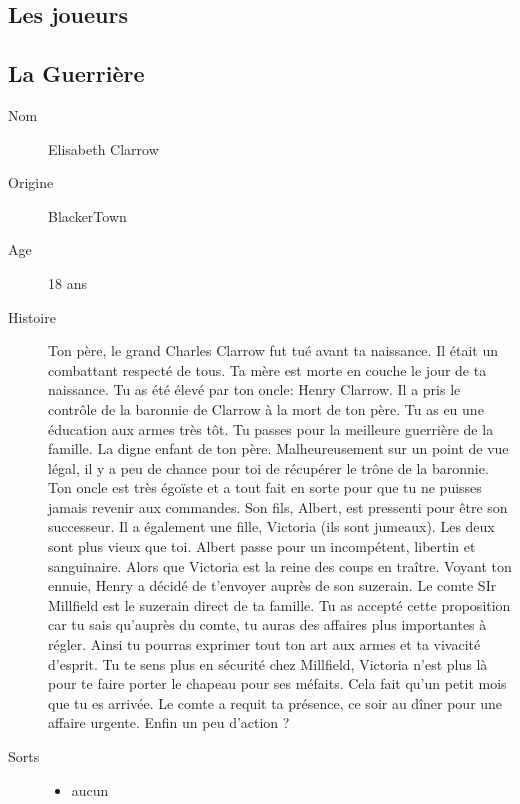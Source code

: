 \documentclass[oneside,12pt]{book}
\begin{document}
\begin{flushleft}
\clearpage

\section{Les joueurs}
\subsection{La Guerrière}
\begin{description}
\item[Nom]{ Elisabeth Clarrow}
\item[Origine]{BlackerTown}
\item[Age]{ 18 ans}
\item[Histoire]{Ton père, le grand Charles Clarrow fut tué avant ta naissance. Il était un combattant respecté de tous. Ta mère est morte en couche le jour de ta naissance. Tu as été élevé par ton oncle: Henry Clarrow. Il a pris le contrôle de la baronnie de Clarrow à la mort de ton père. Tu as eu une éducation aux armes très tôt. Tu passes pour la meilleure guerrière de la famille. La digne enfant de ton père. Malheureusement sur un point de vue légal, il y a peu de chance pour toi de récupérer le trône de la baronnie. Ton oncle est très égoïste et a tout fait en sorte pour que tu ne puisses jamais revenir aux commandes. Son fils, Albert, est pressenti pour être son successeur. Il a également une fille, Victoria (ils sont jumeaux). Les deux sont plus vieux que toi. Albert passe pour un incompétent, libertin et sanguinaire. Alors que Victoria est la reine des coups en traître. Voyant ton ennuie, Henry a décidé de t'envoyer auprès de son suzerain. Le comte SIr Millfield est le suzerain direct de ta famille. Tu as accepté cette proposition car tu sais qu'auprès du comte, tu auras des affaires plus importantes à régler. Ainsi tu pourras exprimer tout ton art aux armes et ta vivacité d'esprit. Tu te sens plus en sécurité chez Millfield, Victoria n'est plus là pour te faire porter le chapeau pour ses méfaits. Cela fait qu'un petit mois que tu es arrivée. Le comte a requit ta présence, ce soir au dîner pour une affaire urgente. Enfin un peu d'action ? }
\item[Sorts]{
\begin{itemize}
\item aucun
\end{itemize}
}
\end{description}
\clearpage


\end{flushleft}
\end{document}
